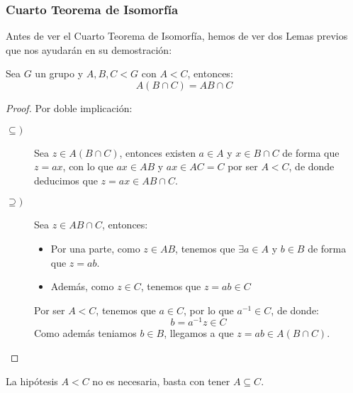 \subsubsection{Cuarto Teorema de Isomorfía}
\noindent
Antes de ver el Cuarto Teorema de Isomorfía, hemos de ver dos Lemas previos que nos ayudarán en su demostración:
\begin{lema}
    Sea $G$ un grupo y $A,B,C < G$ con $A<C$, entonces:
    \begin{equation*}
        A(B\cap C) = AB \cap C
    \end{equation*}
    \begin{proof}
        Por doble implicación:
        \begin{description}
            \item [$\subseteq)$] Sea $z\in A(B\cap C)$, entonces existen $a\in A$ y $x\in B\cap C$ de forma que $z=ax$, con lo que $ax\in AB$ y $ax\in AC = C$ por ser $A<C$, de donde deducimos que $z = ax \in AB\cap C$.
            \item [$\supseteq)$] Sea $z\in AB\cap C$, entonces:
                \begin{itemize}
                    \item Por una parte, como $z\in AB$, tenemos que $\exists a\in A$ y $b\in B$ de forma que $z=ab$.
                    \item Además, como $z\in C$, tenemos que $z = ab \in C$
                \end{itemize}
                Por ser $A<C$, tenemos que $a\in C$, por lo que $a^{-1}\in C$, de donde:
                \begin{equation*}
                    b = a^{-1}z \in C
                \end{equation*}
                Como además teniamos $b\in B$, llegamos a que $z=ab \in A(B\cap C)$.
        \end{description}
    \end{proof}
\end{lema}

\begin{observacion}
    La hipótesis $A<C$ no es necesaria, basta con tener $A\subseteq C$.
\end{observacion}

